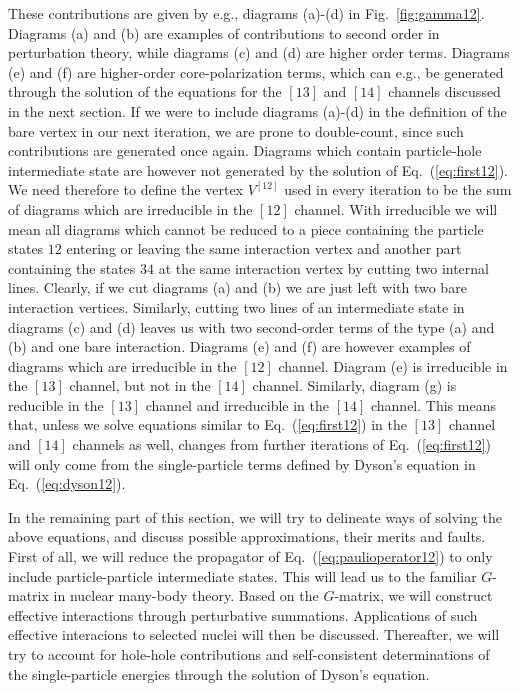 \documentclass[twoside,12pt]{article}
\begin{document}
These contributions
are given by e.g., diagrams (a)-(d) in Fig.\ \ref{fig:gamma12}.
Diagrams (a) and (b) are examples of contributions to second order
in perturbation theory, while diagrams (c) and (d) are higher
order terms. Diagrams (e) and (f) are higher-order core-polarization terms,
which can e.g., be generated through the solution of the equations for
the $[13]$ and $[14]$ channels discussed in the next section.
If we were to include diagrams (a)-(d) in the definition of the bare
vertex in our next iteration,
we are prone to double-count, since such contributions are generated
once again. Diagrams which contain particle-hole intermediate state are however
not generated by the solution of Eq.\ (\ref{eq:first12}).
We need therefore to define the vertex $V^{[12]}$ used in every iteration
to be the sum of diagrams which are irreducible in the $[12]$ channel.
With irreducible we will mean all diagrams which cannot be reduced to
a piece containing the particle states $12$  entering or leaving
the same interaction vertex
and another   part containing the states $34$ at the same interaction
vertex by cutting two internal lines.
Clearly, if we cut diagrams (a) and (b) we are just left with two bare
interaction vertices. Similarly, cutting two lines of an intermediate
state in diagrams (c) and (d) leaves us with two second-order terms
of the type (a) and (b) and one bare interaction.
Diagrams (e) and (f) are however examples of diagrams which are
irreducible in the $[12]$ channel. Diagram (e) is
irreducible in the $[13]$ channel, but not in the $[14]$ channel.
Similarly, diagram (g) is reducible in the $[13]$ channel and
irreducible in the $[14]$ channel.
This means that, unless we solve equations similar to Eq.\ (\ref{eq:first12})
in the $[13]$ channel and $[14]$ channels as well, changes
from further iterations
of Eq.\ (\ref{eq:first12}) will only come from
the single-particle terms defined
by Dyson's equation in Eq.\ (\ref{eq:dyson12}).

In the remaining part of this section, we will try to delineate ways
of solving the above equations, and discuss possible approximations,
their merits and faults. First of all, we will reduce
the propagator of  Eq.\ (\ref{eq:paulioperator12}) to only include
particle-particle intermediate states. This will lead us to the familiar
$G$-matrix in nuclear many-body theory.
Based on the $G$-matrix, we will construct effective interactions
through perturbative summations. Applications of such
effective interacions to selected nuclei will then be discussed.
Thereafter, we will try to
account for hole-hole contributions and 
self-consistent determinations of the single-particle
energies through the solution of Dyson's equation.
\end{document}
